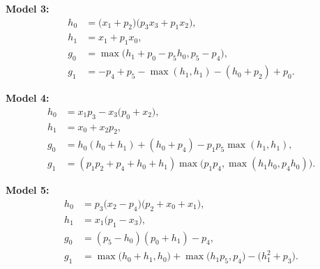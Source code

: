 \documentclass[14pt]{extarticle}
\begin{document}
    \textbf{Model 3:}
    \begin{align*}
    h_0 &= \bigl(x_1 + p_2\bigr)\bigl(p_3x_3 + p_1x_2\bigr),\\
    h_1 &= x_1 + p_1x_0,\\
    g_0 &= \max\bigl(h_1 + p_0 - p_5h_0, p_5 - p_4\bigr),\\
    g_1 &= -p_4 + p_5 - \max(h_1,h_1) - (h_0 + p_2) + p_0.
    \end{align*}
    
    \textbf{Model 4:}
    \begin{align*}
    h_0 &= x_1p_3 - x_3\bigl(p_0 + x_2\bigr),\\
    h_1 &= x_0 + x_2p_2,\\
    g_0 &= h_0(h_0 + h_1) + (h_0 + p_4) - p_1p_5\max(h_1,h_1),\\
    g_1 &= (p_1p_2 + p_4 + h_0 + h_1)\max\bigl(p_1p_4, \max(h_1h_0,p_4h_0)\bigr).
    \end{align*}
    
    \textbf{Model 5:}
    \begin{align*}
    h_0 &= p_3\bigl(x_2 - p_4\bigr)\bigl(p_2 + x_0 + x_1\bigr),\\
    h_1 &= x_1\bigl(p_1 - x_3\bigr),\\
    g_0 &= (p_5 - h_0)(p_0 + h_1) - p_4,\\
    g_1 &= \max\bigl(h_0 + h_1,h_0\bigr) + \max\bigl(h_1p_5,p_4\bigr) - \bigl(h_1^2 + p_3\bigr).
    \end{align*}
\end{document}
